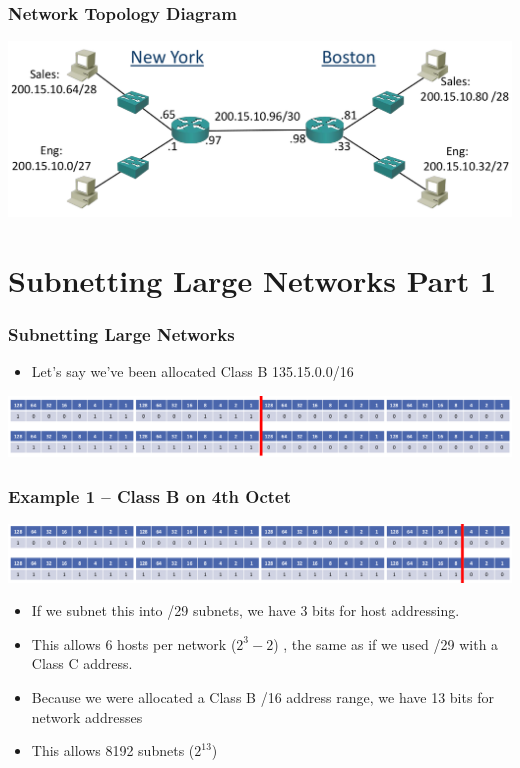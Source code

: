 \documentclass[pdflatex,compress]{beamer}
\begin{document}
\begin{frame}
	\frametitle{Network Topology Diagram}
	\begin{center}
		\includegraphics[width=\linewidth]{img/img15}
	\end{center}
\end{frame}

\section{Subnetting Large Networks Part 1}

\begin{frame}
	\frametitle{Subnetting Large Networks}
	\begin{itemize}
		\item Let’s say we’ve been allocated Class B 135.15.0.0/16
	\end{itemize}
	\begin{center}
		\includegraphics[width=\linewidth]{img/img16}
	\end{center}
\end{frame}

\begin{frame}
	\frametitle{Example 1 – Class B on 4th Octet}
	\begin{center}
		\includegraphics[width=\linewidth]{img/img17}
	\end{center}
	\begin{itemize}
		\item If we subnet this into /29 subnets, we have 3 bits for host addressing.
		\item This allows 6 hosts per network ($ 2^3 - 2 $) , the same as if we used /29 with a Class C address.
		\item Because we were allocated a Class B /16 address range, we have 13 bits for network addresses
		\item This allows 8192 subnets ($ 2^13 $)
	\end{itemize}
\end{frame}
\end{document}
